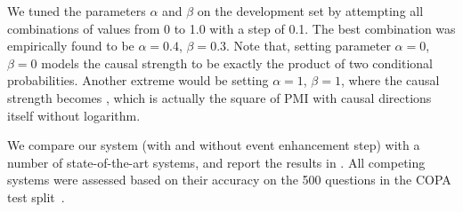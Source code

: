 We tuned the parameters $\alpha$ and $\beta$ on the development set by
attempting all combinations of values from 0 to 1.0 with a step of
0.1. The best combination was empirically found  to be $\alpha=0.4$,
$\beta=0.3$. Note that, setting parameter $\alpha=0$,
$\beta=0$ models the causal strength to be exactly the product of
two conditional probabilities. Another extreme would be setting
$\alpha=1$, $\beta=1$, where the causal strength becomes ,
which is actually the square of PMI with causal directions
itself without logarithm.

We compare our system (with and without event enhancement step)
with a number of state-of-the-art systems, and report the results in
.
All competing systems were assessed based
on their accuracy on the 500 questions in the COPA test
split~\cite{gordon2012copa}.


